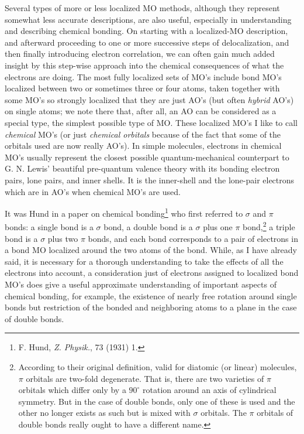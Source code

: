 \documentclass[11pt]{memoir}
\begin{document}
Several types of more or less localized MO methods, although they represent somewhat less accurate descriptions, are also useful, especially in understanding and describing chemical bonding.  On starting with a localized-MO description, and afterward proceeding to one or more successive steps of delocalization, and then finally introducing electron correlation, we can often gain much added insight by this step-wise approach into the chemical consequences of what the electrons are doing.  The most fully localized sets of MO's include bond MO's localized between two or sometimes three or four atoms, taken together with some MO's so strongly localized that they are just AO's (but often \emph{hybrid} AO's) on single atoms; we note there that, after all, an AO can be considered as a special type, the simplest possible type of MO.  These localized MO's I like to call \emph{chemical} MO's (or just \emph{chemical orbitals} because of the fact that some of the orbitals used are now really AO's).  In simple molecules, electrons in chemical MO's usually represent the closest possible quantum-mechanical counterpart to G. N. Lewis' beautiful pre-quantum valence theory with its bonding electron pairs, lone pairs, and inner shells.  It is the inner-shell and the lone-pair electrons which are in AO's when chemical MO's are used.

It was Hund in a paper on chemical bonding\footnote{F. Hund, \emph{Z. Physik.}, 73 (1931) 1.} who first referred to $\sigma$ and $\pi$ bonds: a single bond is a $\sigma$ bond, a double bond is a $\sigma$ plus one $\pi$ bond,\footnote{According to their original definition, valid for diatomic (or linear) molecules, $\pi$ orbitals are two-fold degenerate.  That is, there are two varieties of $\pi$ orbitals which differ only by a $90^{\circ}$ rotation around an axis of cylindrical symmetry.  But in the case of double bonds, only one of these is used and the other no longer exists as such but is mixed with $\sigma$ orbitals.  The $\pi$ orbitals of double bonds really ought to have a different name.} a triple bond is a $\sigma$ plus two $\pi$ bonds, and each bond corresponds to a pair of electrons in a bond MO localized around the two atoms of the bond.  While, as I have already said, it is necessary for a thorough understanding to take the effects of all the electrons into account, a consideration just of electrons assigned to localized bond MO's does give a useful approximate understanding of important aspects of chemical bonding, for example, the existence of nearly free rotation around single bonds but restriction of the bonded and neighboring atoms to a plane in the case of double bonds.
\end{document}
